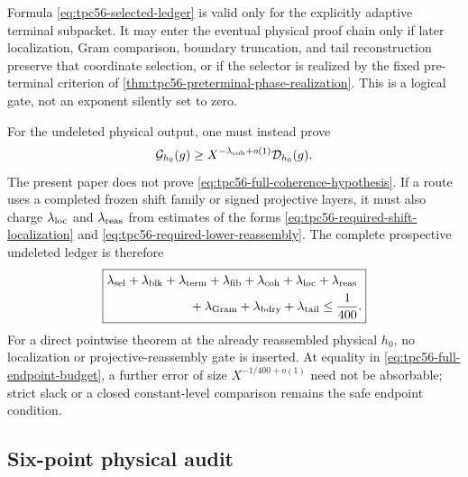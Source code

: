 Formula \eqref{eq:tpc56-selected-ledger} is valid only for the explicitly
adaptive terminal subpacket.  It may enter the eventual physical proof
chain only if later localization, Gram comparison, boundary truncation,
and tail reconstruction preserve that coordinate selection, or if the
selector is realized by the fixed pre-terminal criterion of
\cref{thm:tpc56-preterminal-phase-realization}.  This is a logical gate,
not an exponent silently set to zero.

For the undeleted physical output, one must instead prove
\begin{equation}
 \mathcal G_{h_0}(g)
 \ge X^{-\lambda_{\rm coh}+o(1)}\mathcal D_{h_0}(g).
 \label{eq:tpc56-full-coherence-hypothesis}
\end{equation}
The present paper does not prove \eqref{eq:tpc56-full-coherence-hypothesis}.
If a route uses a completed frozen shift family or signed projective
layers, it must also charge \(\lambda_{\rm loc}\) and
\(\lambda_{\rm reas}\) from estimates of the forms
\eqref{eq:tpc56-required-shift-localization} and
\eqref{eq:tpc56-required-lower-reassembly}.  The complete prospective
undeleted ledger is therefore
\begin{equation}
 \boxed{
 \begin{aligned}
 &\lambda_{\rm sel}+\lambda_{\rm blk}
 +\lambda_{\rm term}+\lambda_{\rm fib}+\lambda_{\rm coh}
 +\lambda_{\rm loc}+\lambda_{\rm reas}\\
 &\hspace{23mm}
 +\lambda_{\rm Gram}+\lambda_{\rm bdry}+\lambda_{\rm tail}
 \le\frac1{400}.
 \end{aligned}}
 \label{eq:tpc56-full-endpoint-budget}
\end{equation}
For a direct pointwise theorem at the already reassembled physical
\(h_0\), no localization or projective-reassembly gate is inserted.  At
equality in \eqref{eq:tpc56-full-endpoint-budget}, a further error of size
\(X^{-1/400+o(1)}\) need not be absorbable; strict slack or a closed
constant-level comparison remains the safe endpoint condition.

\subsection{Six-point physical audit}

